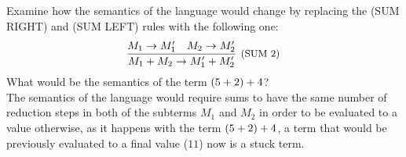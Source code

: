 \subsection{}

Examine how the semantics of the language would change by replacing the
(SUM RIGHT) and (SUM LEFT) rules with the following one:
\[
	\infer[\text{\small{(SUM 2)}}]
	{\SUM{M_1}{M_2} \to \SUM{M_1'}{M_2'}}
	{
		M_1 \to M_1' &
		M_2 \to M_2'
	}
\]
What would be the semantics of the term $(5+2)+4$?\\

The semantics of the language would require sums to have the same number of
reduction steps in both of the subterms $M_1$ and $M_2$ in order to be
evaluated to a value otherwise, as it happens with the term
$(5+2)+4$, a term that would be previously evaluated to a final
value ($11$) now is a stuck term.

